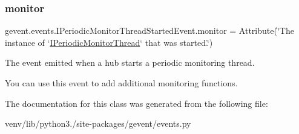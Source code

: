 \subsubsection{\texorpdfstring{monitor}{monitor}}
{\footnotesize\ttfamily gevent.\+events.\+I\+Periodic\+Monitor\+Thread\+Started\+Event.\+monitor = Attribute(\char`\"{}The instance of `\hyperlink{classgevent_1_1events_1_1_i_periodic_monitor_thread}{I\+Periodic\+Monitor\+Thread}` that was started.\char`\"{})\hspace{0.3cm}{\ttfamily [static]}}

\begin{DoxyVerb}The event emitted when a hub starts a periodic monitoring thread.

You can use this event to add additional monitoring functions.
\end{DoxyVerb}
 

The documentation for this class was generated from the following file\+:\begin{DoxyCompactItemize}
\item 
venv/lib/python3./site-\/packages/gevent/events.\+py\end{DoxyCompactItemize}
